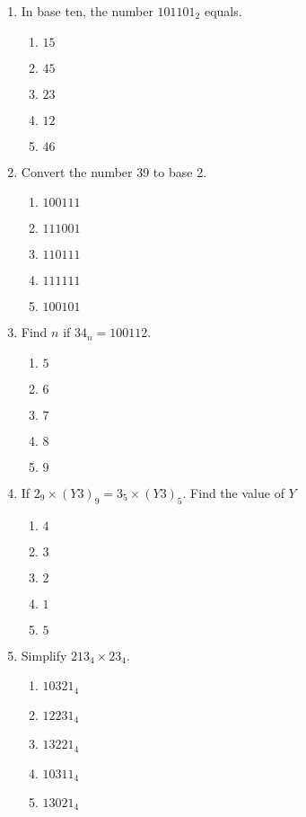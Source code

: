 \begin{multicols}{2}
\begin{enumerate}[label={\arabic*.}]
\item In base ten, the number \({101101}_2\) equals. 
	\begin{enumerate}[label={\Alph*.}]
	\item \(15\)
	\item \(45\)
	\item \(23\)
	\item \(12\)
 	\item \(46\)
	\end{enumerate}
 
\item Convert the number 39 to base 2.
	\begin{enumerate}[label={\Alph*.}]
	\item \(100111\)
	\item \(111001\)
	\item \(110111\)
	\item \(111111\)
 	\item \(100101\)
	\end{enumerate}
 
\item Find \(n\) if \({34}_n = 100112\). 
	\begin{enumerate}[label={\Alph*.}]
	\item \(5\)
	\item \(6\)
	\item \(7\)
	\item \(8\)
 	\item \(9\)
	\end{enumerate}

\item If \(2_9 \times {(Y3)}_9 = {3}_5 \times {(Y3)}_5\). Find the value of \(Y\)
	\begin{enumerate}[label={\Alph*.}]
	\item \(4\)
	\item \(3\)
	\item \(2\)
	\item \(1\)
 	\item \(5\)
	\end{enumerate}

\item Simplify \({213}_4 \times {23}_4\).		
	\begin{enumerate}[label={\Alph*.}]
	\item \({10321}_4\)
	\item \({12231}_4\)
	\item \({13221}_4\)
	\item \({10311}_4\)
 	\item \({13021}_4\)
	\end{enumerate}
 

\end{enumerate}
\end{multicols}

